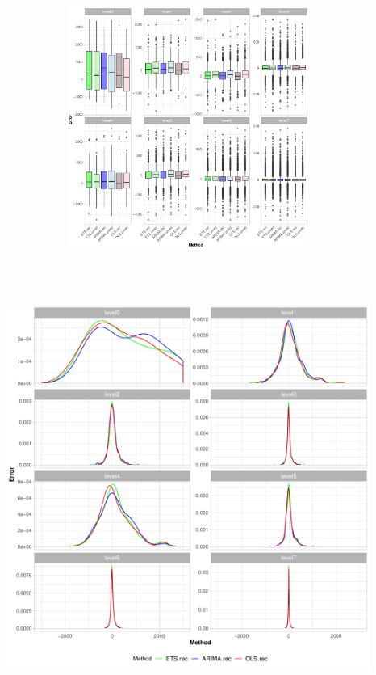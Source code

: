 \documentclass[11pt,a4paper,]{article}
\let\origfigure\figure
\let\endorigfigure\endfigure
\renewenvironment{figure}[1][2] {
    \expandafter\origfigure\expandafter[htbp]
} {
    \endorigfigure
}
\begin{document}
\begin{figure}

{\centering \includegraphics[width=450px,height=300px]{Paper-Figures/results_Tourism/boxplot_1} 

}

\caption{Box plot for forecast errors - Reconciled and unreconciled ETS, ARIMA and OLS in each hierarchy level for 1-step-ahead tourism demand}\label{fig:boxplotrollingtourism}
\end{figure}

\begin{figure}

{\centering \includegraphics[width=450px,height=550px]{Paper-Figures/results_Tourism/densityplot_1} 

}

\caption{Density plot for forecast errors - Reconciled and unreconciled ETS, ARIMA and OLS in each hierarchy level for 1-step-ahead tourism demand using interval (-3000,3000)}\label{fig:densityplotrollingtourism}
\end{figure}
\end{document}
